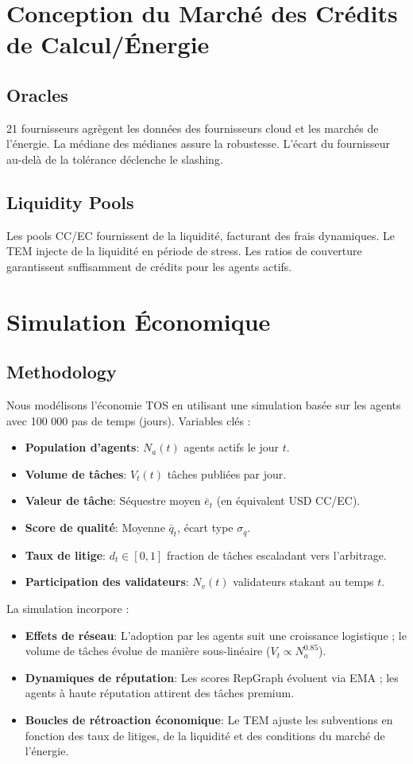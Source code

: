 \documentclass[11pt]{article}
\begin{document}
\section{Conception du Marché des Crédits de Calcul/Énergie}
\subsection{Oracles}
21 fournisseurs agrègent les données des fournisseurs cloud et les marchés de l'énergie. La médiane des médianes assure la robustesse. L'écart du fournisseur au-delà de la tolérance déclenche le slashing.

\subsection{Liquidity Pools}
Les pools CC/EC fournissent de la liquidité, facturant des frais dynamiques. Le TEM injecte de la liquidité en période de stress. Les ratios de couverture garantissent suffisamment de crédits pour les agents actifs.

\section{Simulation Économique}
\label{sec:econ-sim}

\subsection{Methodology}
Nous modélisons l'économie TOS en utilisant une simulation basée sur les agents avec 100 000 pas de temps (jours). Variables clés :
\begin{itemize}[noitemsep]
  \item \textbf{Population d'agents}: $N_a(t)$ agents actifs le jour $t$.
  \item \textbf{Volume de tâches}: $V_t(t)$ tâches publiées par jour.
  \item \textbf{Valeur de tâche}: Séquestre moyen $\bar{e}_t$ (en équivalent USD CC/EC).
  \item \textbf{Score de qualité}: Moyenne $\bar{q}_t$, écart type $\sigma_q$.
  \item \textbf{Taux de litige}: $d_t \in [0,1]$ fraction de tâches escaladant vers l'arbitrage.
  \item \textbf{Participation des validateurs}: $N_v(t)$ validateurs stakant au temps $t$.
\end{itemize}
La simulation incorpore :
\begin{itemize}[noitemsep]
  \item \textbf{Effets de réseau}: L'adoption par les agents suit une croissance logistique ; le volume de tâches évolue de manière sous-linéaire ($V_t \propto N_a^{0.85}$).
  \item \textbf{Dynamiques de réputation}: Les scores RepGraph évoluent via EMA ; les agents à haute réputation attirent des tâches premium.
  \item \textbf{Boucles de rétroaction économique}: Le TEM ajuste les subventions en fonction des taux de litiges, de la liquidité et des conditions du marché de l'énergie.
\end{itemize}
\end{document}
